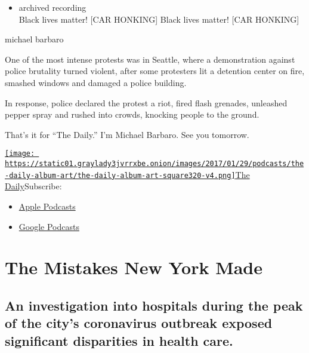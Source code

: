 \begin{itemize}
\tightlist
\item
  archived recording\\
  Black lives matter! {[}CAR HONKING{]} Black lives matter! {[}CAR
  HONKING{]}
\end{itemize}

michael barbaro

One of the most intense protests was in Seattle, where a demonstration
against police brutality turned violent, after some protesters lit a
detention center on fire, smashed windows and damaged a police building.

In response, police declared the protest a riot, fired flash grenades,
unleashed pepper spray and rushed into crowds, knocking people to the
ground.

That's it for ``The Daily.'' I'm Michael Barbaro. See you tomorrow.

\href{https://www.nytimes3xbfgragh.onion/column/the-daily}{\texttt{[image: https://static01.graylady3jvrrxbe.onion/images/2017/01/29/podcasts/the-daily-album-art/the-daily-album-art-square320-v4.png]}The
Daily}Subscribe:

\begin{itemize}
\tightlist
\item
  \href{https://itunes.apple.com/us/podcast/id1200361736}{Apple
  Podcasts}
\item
  \href{https://www.google.com/podcasts?feed=aHR0cHM6Ly9yc3MuYXJ0MTkuY29tL3RoZS1kYWlseQ\%3D\%3D}{Google
  Podcasts}
\end{itemize}

\hypertarget{the-mistakes-new-york-made-1}{%
\section{The Mistakes New York
Made}\label{the-mistakes-new-york-made-1}}

\hypertarget{an-investigation-into-hospitals-during-the-peak-of-the-citys-coronavirus-outbreak-exposed-significant-disparities-in-health-care-1}{%
\subsection{An investigation into hospitals during the peak of the
city's coronavirus outbreak exposed significant disparities in health
care.}\label{an-investigation-into-hospitals-during-the-peak-of-the-citys-coronavirus-outbreak-exposed-significant-disparities-in-health-care-1}}

